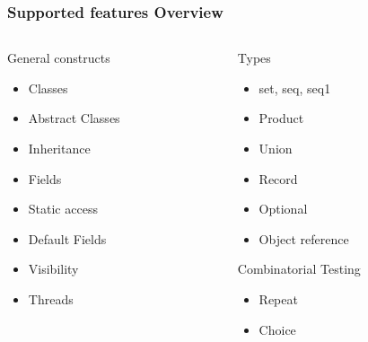 
%
%
\frame
{
  \frametitle{Supported features Overview}
\begin{center}



\begin{columns}
\begin{column}[l]{5cm}

General constructs
  \begin{itemize}
  		\item Classes
  		\item Abstract Classes
  		\item Inheritance
  		\item Fields
  		\item Static access
  		\item Default Fields
  		\item Visibility
  		\item Threads	  	
  \end{itemize}

\end{column}
\begin{column}[r]{5cm}

Types
  \begin{itemize}
  		\item set, seq, seq1
  		\item Product
  		\item Union
  		\item Record	
  		\item Optional
  		\item Object reference
  \end{itemize}

Combinatorial Testing
  \begin{itemize}
  		\item Repeat
  		\item Choice	
  \end{itemize}



\end{column}
\end{columns}


\end{center}
}




